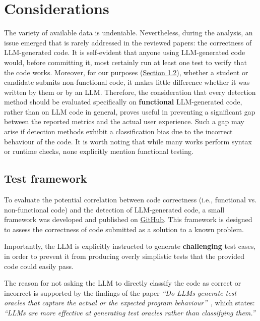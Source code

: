 \clearpage

\section{Considerations}
The variety of available data is undeniable. 
Nevertheless, during the analysis, an issue emerged that is rarely 
addressed in the reviewed papers: the correctness of 
LLM-generated code. It is self-evident that anyone using 
LLM-generated code would, before committing it, 
most certainly run at least one test to verify that the 
code works. Moreover, for our purposes 
(\hyperref[sec:Motivations Behind LLM-Generated Code Detection]{Section 1.2}), 
whether a student or candidate submits non-functional 
code, it makes little difference whether it was written by them or 
by an LLM. Therefore, the consideration that every detection method 
should be evaluated specifically on \textbf{functional} LLM-generated code, 
rather than on LLM code in general, proves useful in preventing a 
significant gap between the reported metrics and the actual user 
experience. Such a gap may arise if detection methods exhibit a 
classification bias due to the incorrect behaviour of the code. 
It is worth noting that while many works perform syntax or runtime 
checks, none explicitly mention functional testing.

\subsection{Test framework}
\label{section:Test framework}

To evaluate the potential correlation between code correctness 
(i.e., functional vs. non-functional code) and the detection of 
LLM-generated code, a small framework was developed and published on
\href{https://github.com/DelGaudioNunzioSE/Code-LLMsTester.git}{GitHub}.
 This framework is designed 
to assess the correctness of code submitted as a solution to a 
known problem.

Importantly, the LLM is explicitly instructed to generate 
\textbf{challenging} test cases, in order to prevent it from producing 
overly simplistic tests that the provided code could easily pass.

The reason for not asking the LLM to directly classify the code as 
correct or incorrect is supported by the findings of the paper 
\textit{``Do LLMs generate test oracles that capture the actual or 
the expected program behaviour''}~\cite{konstantinou2024llms}, which states: 
\textit{``LLMs are more effective at generating test oracles rather than classifying them.''}

